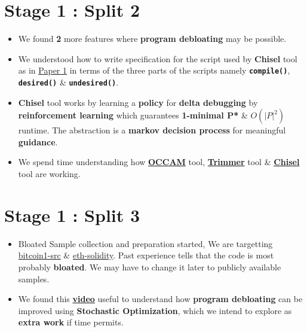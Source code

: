 \documentclass{article} %
\begin{document}
\section*{Stage 1 : Split 2}
\begin{itemize}
	\item We found \textbf{2} more features where \textbf{program debloating} may be possible. 
	\item We understood how to write specification for the script used by \textbf{Chisel} tool as in \href{https://dl.acm.org/doi/10.1145/3243734.3243838}{Paper 1} in terms of the three parts of the scripts namely \textbf{\texttt{compile()}}, \textbf{\texttt{desired()}} \& \texttt{\textbf{undesired()}}.
	\item \textbf{Chisel} tool works by learning a \textbf{policy} for \textbf{delta debugging} by \textbf{reinforcement learning} which guarantees \textbf{1-minimal P*} \& $\textbf{$O(|P|^2)$}$ runtime. The abstraction is a \textbf{markov decision process} for meaningful \textbf{guidance}.
	\item We spend time understanding how \textbf{\href{https://github.com/ashish-gehani/OCCAM}{OCCAM}} tool, \textbf{\href{http://www.csl.sri.com/users/gehani/papers/ASE-2018.Trimmer.pdf}{Trimmer}} tool \& \textbf{\href{https://github.com/aspire-project/chisel}{Chisel}} tool are working. 
\end{itemize}

\section*{Stage 1 : Split 3}
\begin{itemize}
	\item Bloated Sample collection and preparation started, We are targetting \href{https://github.com/bitcoin/bitcoin}{bitcoin1-src} \& \href{https://github.com/ethereum/solidity}{eth-solidity}. Past experience tells that the code is most probably \textbf{bloated}. We may have to change it later to publicly available samples. 
	\item We found this \textbf{\href{https://www.youtube.com/watch?v=hC4zIwyv1bg}{video}} useful to understand how \textbf{program debloating} can be improved using \textbf{Stochastic Optimization}, which we intend to explore as \textbf{extra work} if time permits.
\end{itemize}
\end{document}
